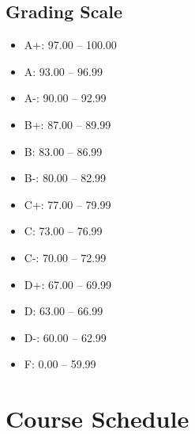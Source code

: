 \documentclass[12pt, letterpaper]{article}
\begin{document}
\subsection*{Grading Scale}

\begin{itemize}
    \item A+: 97.00 -- 100.00
    \item A: 93.00 -- 96.99
    \item A-: 90.00 -- 92.99
    \item B+: 87.00 -- 89.99
    \item B: 83.00 -- 86.99
    \item B-: 80.00 -- 82.99
    \item C+: 77.00 -- 79.99
    \item C: 73.00 -- 76.99
    \item C-: 70.00 -- 72.99
    \item D+: 67.00 -- 69.99
    \item D: 63.00 -- 66.99
    \item D-: 60.00 -- 62.99
    \item F: 0.00 -- 59.99
\end{itemize}

\section{Course Schedule}
\end{document}
